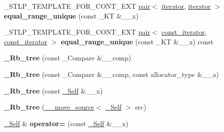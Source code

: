 \begin{DoxyCompactItemize}
\mbox{\label{class___rb__tree_a8c21e26a576b361e54e9f82ef967f48e}} 
\+\_\+\+S\+T\+L\+P\+\_\+\+T\+E\+M\+P\+L\+A\+T\+E\+\_\+\+F\+O\+R\+\_\+\+C\+O\+N\+T\+\_\+\+E\+XT \hyperlink{structpair}{pair}$<$ \hyperlink{struct___rb__tree__iterator}{iterator}, \hyperlink{struct___rb__tree__iterator}{iterator} $>$ {\bfseries equal\+\_\+range\+\_\+unique} (const \+\_\+\+KT \&\+\_\+\+\_\+x)
\item 
\mbox{\label{class___rb__tree_a31ce190bfc0d827852c917f9e220b45f}} 
\+\_\+\+S\+T\+L\+P\+\_\+\+T\+E\+M\+P\+L\+A\+T\+E\+\_\+\+F\+O\+R\+\_\+\+C\+O\+N\+T\+\_\+\+E\+XT \hyperlink{structpair}{pair}$<$ \hyperlink{struct___rb__tree__iterator}{const\+\_\+iterator}, \hyperlink{struct___rb__tree__iterator}{const\+\_\+iterator} $>$ {\bfseries equal\+\_\+range\+\_\+unique} (const \+\_\+\+KT \&\+\_\+\+\_\+x) const
\item 
\mbox{\label{class___rb__tree_a046e86cd002e4c2802bb26c4bb7c0044}} 
{\bfseries \+\_\+\+Rb\+\_\+tree} (const \+\_\+\+Compare \&\+\_\+\+\_\+comp)
\item 
\mbox{\label{class___rb__tree_ace2f35110a37d9ae54510c10cfeedd81}} 
{\bfseries \+\_\+\+Rb\+\_\+tree} (const \+\_\+\+Compare \&\+\_\+\+\_\+comp, const allocator\+\_\+type \&\+\_\+\+\_\+a)
\item 
\mbox{\label{class___rb__tree_ab9fd048c4fc21ba02d1ae9654a79f628}} 
{\bfseries \+\_\+\+Rb\+\_\+tree} (const \hyperlink{class___rb__tree}{\+\_\+\+Self} \&\+\_\+\+\_\+x)
\item 
\mbox{\label{class___rb__tree_a0a615c7749fb4638e794865d46d7d63c}} 
{\bfseries \+\_\+\+Rb\+\_\+tree} (\hyperlink{class____move__source}{\+\_\+\+\_\+move\+\_\+source}$<$ \hyperlink{class___rb__tree}{\+\_\+\+Self} $>$ src)
\item 
\mbox{\label{class___rb__tree_ad5340d4cd5eb7596845ab3acc7401772}} 
\hyperlink{class___rb__tree}{\+\_\+\+Self} \& {\bfseries operator=} (const \hyperlink{class___rb__tree}{\+\_\+\+Self} \&\+\_\+\+\_\+x)
\item 
\mbox{\label{class___rb__tree_a1ee7252c63a788cf5355b15c1c8931e3}} 

\end{DoxyCompactItemize}

